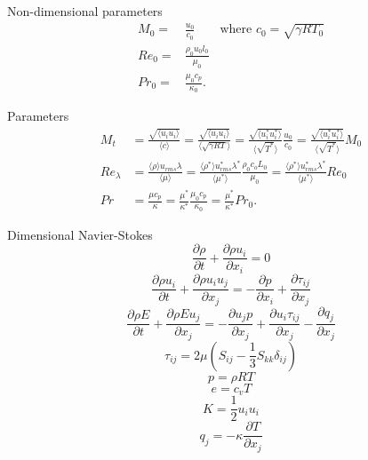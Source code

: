 \documentclass[oneside,a4paper,11pt]{report}
\begin{document}
Non-dimensional parameters
\begin{align}
    M_0 =& \frac{u_0}{c_0} \qquad \text{where } c_0 = \sqrt{\gamma R T_0} \\
    Re_0 =& \frac{\rho_0 u_0 l_0}{\mu_0}\\
    Pr_0 =& \frac{\mu_0 c_p}{\kappa_0}.
\end{align}

Parameters
\begin{align}
    M_t &= \frac{\sqrt{\langle u_i u_i \rangle}}{ \langle c \rangle} = \frac{\sqrt{\langle u_i u_i \rangle}}{ \langle \sqrt{\gamma R T} \rangle} = \frac{\sqrt{\langle u^*_i u^*_i \rangle}}{ \langle \sqrt{T^*} \rangle} \frac{u_0}{c_0} = \frac{\sqrt{\langle u^*_i u^*_i \rangle}}{ \langle \sqrt{T^*} \rangle} M_0 \\
    Re_\lambda &= \frac{\langle \rho \rangle u_{rms} \lambda }{\langle \mu \rangle} = \frac{\langle \rho^* \rangle u^*_{rms} \lambda^* }{\langle \mu^* \rangle} \frac{\rho_0 c_o L_0}{\mu_0} = \frac{\langle \rho^* \rangle u^*_{rms} \lambda^* }{\langle \mu^* \rangle} Re_0 \\
    Pr &= \frac{\mu c_p}{\kappa} = \frac{\mu^*}{\kappa^*} \frac{\mu_0 c_p}{\kappa_0} = \frac{\mu^*}{\kappa^*} Pr_0.
\end{align}

\newpage
Dimensional Navier-Stokes
\begin{equation}
\frac{\partial \rho}{\partial t} + \frac{\partial \rho u_i}{\partial x_i} = 0
\end{equation}
\begin{equation}
\frac{\partial \rho u_i}{\partial t} + \frac{\partial \rho u_i u_j}{\partial x_j} = -\frac{\partial p}{\partial x_i} + \frac{\partial \tau_{ij}}{\partial x_j}
\end{equation}
\begin{equation}
\frac{\partial \rho E}{\partial t} + \frac{\partial \rho E u_j}{\partial x_j} = -\frac{\partial u_j p}{\partial x_j} + \frac{\partial u_i \tau_{ij}}{\partial x_j} - \frac{\partial q_j}{\partial x_j}
\end{equation}
\begin{equation}
\tau_{ij} = 2 \mu \left (S_{ij} - \frac{1}{3} S_{kk} \delta_{ij} \right )
\end{equation}
\begin{equation}
p = \rho R T
\end{equation}
\begin{equation}
e = c_v T
\end{equation}
\begin{equation}
K = \frac{1}{2} u_i u_i
\end{equation}
\begin{equation}
q_j = -\kappa \frac{\partial T}{\partial x_j}
\end{equation}
\end{document}
